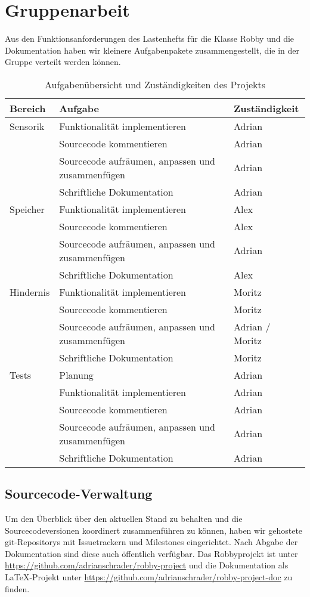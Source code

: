 \section{Gruppenarbeit}
Aus den Funktionsanforderungen des Lastenhefts für die Klasse Robby und die Dokumentation haben wir kleinere Aufgabenpakete zusammengestellt, die in der Gruppe verteilt werden können.

\begin{table*}
    \centering
    \caption{Aufgabenübersicht und Zuständigkeiten des Projekts}
    \begin{tabular}{ l l l }
        \textbf{Bereich} & \textbf{Aufgabe} & \textbf{Zuständigkeit}\\ \hline\hline
        Sensorik & Funktionalität implementieren & Adrian \\
                 & Sourcecode kommentieren & Adrian \\
                 & Sourcecode aufräumen, anpassen und zusammenfügen & Adrian \\
                 & Schriftliche Dokumentation & Adrian \\ \hline
        Speicher & Funktionalität implementieren & Alex \\
                 & Sourcecode kommentieren & Alex \\
                 & Sourcecode aufräumen, anpassen und zusammenfügen & Adrian \\
                 & Schriftliche Dokumentation & Alex \\ \hline
       Hindernis & Funktionalität implementieren & Moritz \\
                 & Sourcecode kommentieren & Moritz \\
                 & Sourcecode aufräumen, anpassen und zusammenfügen & Adrian / Moritz \\
                 & Schriftliche Dokumentation & Moritz \\ \hline
        Tests    & Planung & Adrian \\
                 & Funktionalität implementieren & Adrian \\
                 & Sourcecode kommentieren & Adrian \\
                 & Sourcecode aufräumen, anpassen und zusammenfügen & Adrian \\
                 & Schriftliche Dokumentation & Adrian \\ \hline
    \end{tabular}
\end{table*}

\subsection*{Sourcecode-Verwaltung}
Um den Überblick über den aktuellen Stand zu behalten und die Sourcecodeversionen koordinert zusammenführen zu können, haben wir gehostete git-Repositorys mit Issuetrackern und Milestones eingerichtet. Nach Abgabe der Dokumentation sind diese auch öffentlich verfügbar. Das Robbyprojekt ist unter \url{https://github.com/adrianschrader/robby-project} und die Dokumentation als \LaTeX-Projekt unter \url{https://github.com/adrianschrader/robby-project-doc} zu finden.

